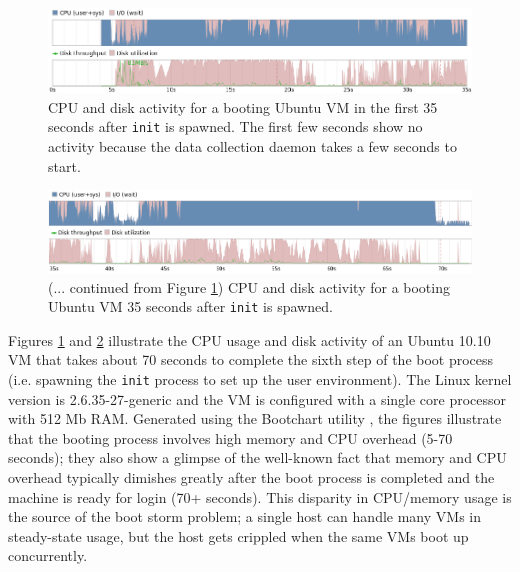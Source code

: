 \begin{figure}[h]
  \centering
  \includegraphics[scale=0.64, trim=1cm 0cm 1cm 0cm]{boot_first35seconds.png}
  \caption[CPU and disk activity for a booting Ubuntu VM in the first 35
  seconds after \texttt{init} is spawned]%
  {CPU and disk activity for a booting Ubuntu VM in the first 35 seconds after \texttt{init} is spawned.
  The first few seconds show no activity because
  the data collection daemon takes a few seconds to start.}
  \label{boot:first35}
\end{figure}

\begin{figure}[h]
  \center
  \includegraphics[scale=0.6, trim=1cm 0cm 1cm 0cm]{boot_last35seconds.png}
  \caption[(... continued) CPU and disk activity for a booting VM
  35 seconds after \texttt{init} is spawned. ]%
  {(... continued from Figure \ref{boot:first35}) CPU and disk activity for a booting Ubuntu VM 35 seconds after \texttt{init} is spawned.}
  \label{boot:last35}
\end{figure}

Figures \ref{boot:first35} and \ref{boot:last35}
illustrate the CPU usage and disk activity 
of an Ubuntu 10.10 VM that takes about 70 seconds
to complete the sixth step of the boot process (i.e. spawning 
the \texttt{init} process to set up the user environment).
The Linux kernel version is 2.6.35-27-generic
and the VM is configured with a single core processor
with 512 Mb RAM. Generated using
the Bootchart utility \cite{mahkovec2005bootchart},
the figures illustrate that
the booting process involves high memory
and CPU overhead (5-70 seconds); they also 
show a glimpse of the well-known fact that memory and CPU
overhead typically dimishes greatly after the boot
process is completed and the machine is
ready for login (70+ seconds). This disparity
in CPU/memory usage is the source of the boot storm problem;
a single host can handle many VMs in
steady-state usage, but the host gets crippled
when the same VMs boot up concurrently.

